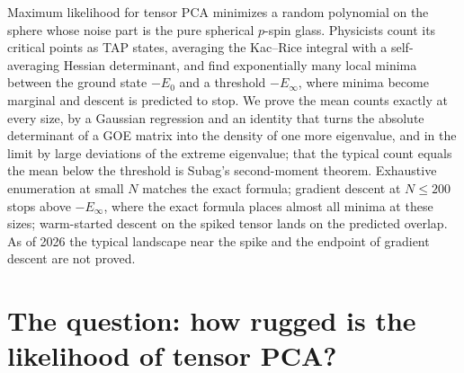 \newcommand{\kacriceCrt}{\mathrm{Crt}}
\newcommand{\kacriceHess}{\operatorname{Hess}}
\newcommand{\kacricegrad}{\operatorname{grad}}
\newcommand{\kacriceGS}{\mathrm{GS}}
\newcommand{\kacriceML}{\lambda_{\mathrm{ML}}}
\newcommand{\kacriceGOE}{\mathrm{GOE}}
\newcommand{\kacriceinf}{E_\infty}

\begin{refsection}

\begin{chaptersummary}
Maximum likelihood for tensor PCA minimizes a random polynomial on the sphere whose noise part is the pure spherical $p$-spin glass. Physicists count its critical points as TAP states, averaging the Kac--Rice integral with a self-averaging Hessian determinant, and find exponentially many local minima between the ground state $-E_0$ and a threshold $-\kacriceinf$, where minima become marginal and descent is predicted to stop. We prove the mean counts exactly at every size, by a Gaussian regression and an identity that turns the absolute determinant of a GOE matrix into the density of one more eigenvalue, and in the limit by large deviations of the extreme eigenvalue; that the typical count equals the mean below the threshold is Subag's second-moment theorem. Exhaustive enumeration at small $N$ matches the exact formula; gradient descent at $N\le200$ stops above $-\kacriceinf$, where the exact formula places almost all minima at these sizes; warm-started descent on the spiked tensor lands on the predicted overlap. As of 2026 the typical landscape near the spike and the endpoint of gradient descent are not proved.
\end{chaptersummary}

\section{The question: how rugged is the likelihood of tensor PCA?}\label{sec:kacrice:question}


\end{refsection}

